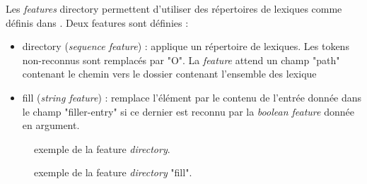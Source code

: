 \documentclass[manual-fr.tex]{subfiles}
\begin{document}
Les \textit{features} directory permettent d'utiliser des répertoires de lexiques comme définis dans \cite{dupont2017exploration}. Deux features sont définies :
\begin{itemize}
    \item directory (\textit{sequence feature}) : applique un répertoire de lexiques. Les tokens non-reconnus sont remplacés par "O". La \textit{feature} attend un champ "path" contenant le chemin vers le dossier contenant l'ensemble des lexique
    \item fill (\textit{string feature}) : remplace l'élément par le contenu de l'entrée donnée dans le champ "filler-entry" si ce dernier est reconnu par la \textit{boolean feature} donnée en argument.
\end{itemize}

\begin{figure}[ht!]
\footnotesize
\begin{xml}
\end{xml}
\caption{exemple de la feature \textit{directory}.}
\label{fig:feature-directory}
\end{figure}

\begin{figure}[ht!]
\footnotesize
\begin{xml}
\end{xml}
\caption{exemple de la feature \textit{directory} "fill".}
\label{fig:feature-directory-fill}
\end{figure}
\end{document}
